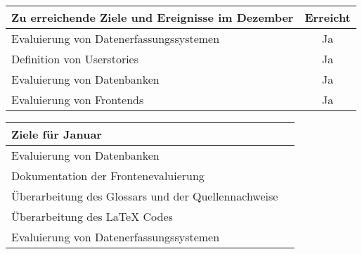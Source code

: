 \begin{tabularx}{\textwidth}{Xc}
    \arrayrulecolor{OliveGreen}
    \toprule
    {\bfseries Zu erreichende Ziele und Ereignisse im Dezember} & {\bfseries Erreicht} \\
    \midrule[2pt]
    Evaluierung von Datenerfassungssystemen                     &Ja                    \\
    \rowcolor{OliveGreen!15}
    Definition von Userstories                                  &Ja                    \\
    \rowcolor{White}
    Evaluierung von Datenbanken                                 &Ja                    \\
    \rowcolor{OliveGreen!15}
    Evaluierung von Frontends                                   &Ja                    \\
    \bottomrule[2pt]
\end{tabularx}
%
\vspace{1cm}
%
\begin{tabularx}{\textwidth}{Xc}
    \arrayrulecolor{OliveGreen}
    \toprule
    {\bfseries Ziele für Januar}                         &                      \\
    \midrule[2pt]
    Evaluierung von Datenbanken                          &                      \\
    \rowcolor{OliveGreen!15}
    Dokumentation der Frontenevaluierung                 &                      \\
    \rowcolor{White}
    Überarbeitung des Glossars und der Quellennachweise  &                      \\
    \rowcolor{OliveGreen!15}
    Überarbeitung des \LaTeX{} Codes                     &                      \\
    \rowcolor{White}
    Evaluierung von Datenerfassungssystemen              &                      \\
\end{tabularx}
